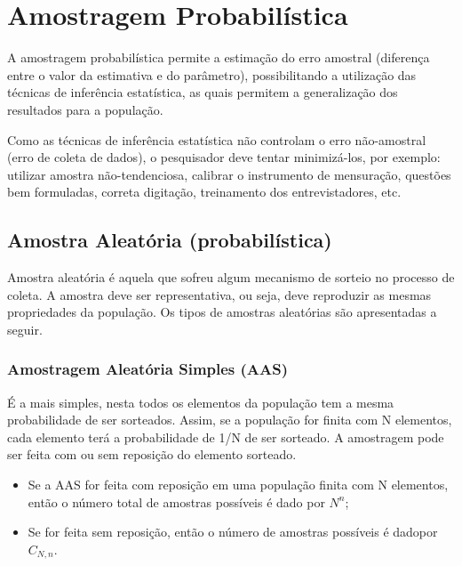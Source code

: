 \documentclass[12pt,brazil,oneside]{book}
\begin{document}
\hypertarget{amostragem-probabilistica}{%
\section{Amostragem Probabilística}\label{amostragem-probabilistica}}

A amostragem probabilística permite a estimação do erro amostral (diferença entre o valor da estimativa e do parâmetro), possibilitando a utilização das técnicas de inferência estatística, as quais permitem a generalização dos resultados para a população.

Como as técnicas de inferência estatística não controlam o erro não-amostral (erro de coleta de dados), o pesquisador deve tentar minimizá-los, por exemplo: utilizar amostra não-tendenciosa, calibrar o instrumento de mensuração, questões bem formuladas, correta digitação, treinamento dos entrevistadores, etc.

\hypertarget{amostra-aleatoria-probabilistica}{%
\subsection{Amostra Aleatória (probabilística)}\label{amostra-aleatoria-probabilistica}}

Amostra aleatória é aquela que sofreu algum mecanismo de sorteio no processo de coleta. A
amostra deve ser representativa, ou seja, deve reproduzir as mesmas propriedades da população. Os tipos
de amostras aleatórias são apresentadas a seguir.

\hypertarget{amostragem-aleatoria-simples-aas}{%
\subsubsection{Amostragem Aleatória Simples (AAS)}\label{amostragem-aleatoria-simples-aas}}

É a mais simples, nesta todos os elementos da população tem a mesma probabilidade de ser
sorteados. Assim, se a população for finita com N elementos, cada elemento terá a probabilidade de 1/N de
ser sorteado. A amostragem pode ser feita com ou sem reposição do elemento sorteado.

\begin{itemize}
\item
  Se a AAS for feita com reposição em uma população finita com N elementos, então o
  número total de amostras possíveis é dado por \(N^n\);
\item
  Se for feita sem reposição, então o número de amostras possíveis é dadopor \(C_{N,n}\).
\end{itemize}
\end{document}
